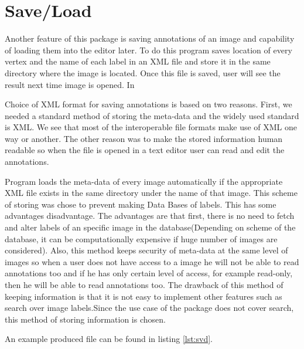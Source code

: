 \section{Save\slash Load}
Another feature of this package is saving annotations of an image and capability of loading them into the editor later. To do this program saves location of every vertex and the name of each label in an XML file and store it in the same directory where the image is located. Once this file is saved, user will see the result next time image is opened. In 

Choice of XML format for saving annotations is based on two reasons. First, we needed a standard method of storing the meta-data and the widely used standard is XML. We see that most of the interoperable file formats make use of XML one way or another. The other reason was to make the stored information human readable so when the file is opened in a text editor user can read and edit the annotations.

Program loads the meta-data of every image automatically if the appropriate XML file exists in the same directory under the name of that image. This scheme of storing was chose to prevent making Data Bases of labels. This has some advantages disadvantage. The advantages are that first, there is no need to fetch and alter labels of an specific image in the database(Depending on scheme of the database, it can be computationally expensive if huge number of images are considered). Also, this method keeps security of meta-data at the same level of images so when a user does not have access to a image he will not be able to read annotations too and if he has only certain level of access, for example read-only, then he will be able to read annotations too. The drawback of this method of keeping information is that it is not easy to implement other features such as search over image labels.Since the use case of the package does not cover search, this method of storing information is chosen.

An example produced file can be found in listing \ref{lst:svd}.    

\begin{center}
\lstset{language=XML, basicstyle=\footnotesize\ttfamily, caption=XML file used to store image labels,frame=single,captionpos=b,label=lst:svd}

\end{center}